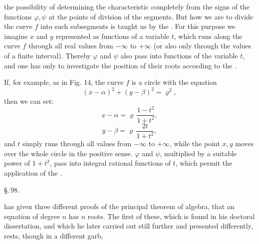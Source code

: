 the possibility of determining the characteristic completely from
the signs of the functions $\varphi, \psi$ at the points of division of the
segments. But how we are to divide the curve $f$ into such subsegments
is taught us by the . For this purpose we imagine
$x$ and $y$ represented as functions of a variable $t$, which runs along the curve $f$ through all
real values from $-\infty$ to $+\infty$
(or also only through the values of a
finite interval). Thereby $\varphi$ and $\psi$ also pass into functions of the variable $t$, and one
has only to investigate the position of their roots according to the .


If, for example, as in Fig. 14, the curve $f$ is a circle with the
equation
\[
(x - \alpha)^2 + (y - \beta)^2 = \varrho^2,
\]
then we can set:
\[
x - \alpha = \varrho\, \frac{1 - t^2}{1 + t^2},
\]
\[
y - \beta = \varrho\, \frac{2t}{1 + t^2},
\]
and $t$ simply runs through all values from $-\infty$ to $+\infty$, while
the point $x, y$ moves over the whole circle in the positive sense.
$\varphi$ and $\psi$, multiplied by a suitable power of
$1 + t^2$, pass into integral rational functions of $t$,
which permit the application of the .

\begin{center}
\S.\,98.

\end{center}

 has given three different proofs of the principal theorem
of algebra, that an equation of degree $n$ has $n$ roots.
The first of these, which is found in his doctoral dissertation, and which he later carried out still further and
presented differently, rests, though in a different garb,
